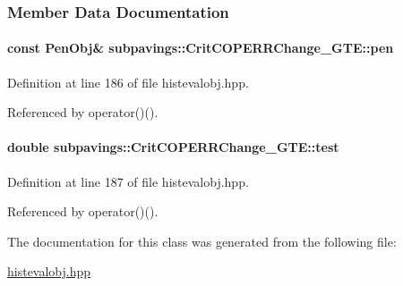 \subsubsection{\-Member \-Data \-Documentation}
\hypertarget{classsubpavings_1_1CritCOPERRChange__GTE_a271ec32d40ebe1dae73df5e346b05864}{
\paragraph[{pen}]{\setlength{\rightskip}{0pt plus 5cm}const {\bf \-Pen\-Obj}\& {\bf subpavings\-::\-Crit\-C\-O\-P\-E\-R\-R\-Change\-\_\-\-G\-T\-E\-::pen}}}\label{classsubpavings_1_1CritCOPERRChange__GTE_a271ec32d40ebe1dae73df5e346b05864}


\-Definition at line 186 of file histevalobj.\-hpp.



\-Referenced by operator()().

\hypertarget{classsubpavings_1_1CritCOPERRChange__GTE_a917da285fdf7ad2e6132f3ec9446dcd0}{
\paragraph[{test}]{\setlength{\rightskip}{0pt plus 5cm}double {\bf subpavings\-::\-Crit\-C\-O\-P\-E\-R\-R\-Change\-\_\-\-G\-T\-E\-::test}}}\label{classsubpavings_1_1CritCOPERRChange__GTE_a917da285fdf7ad2e6132f3ec9446dcd0}


\-Definition at line 187 of file histevalobj.\-hpp.



\-Referenced by operator()().



\-The documentation for this class was generated from the following file\-:\begin{DoxyCompactItemize}
\item 
\hyperlink{histevalobj_8hpp}{histevalobj.\-hpp}\end{DoxyCompactItemize}
